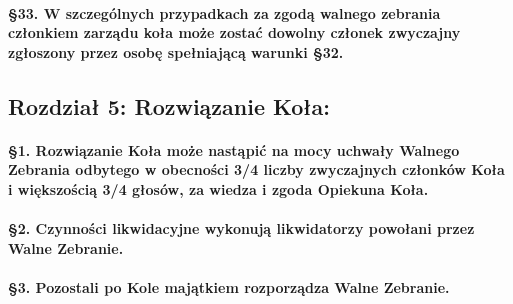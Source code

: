 \documentclass{article}
\begin{document}
		\paragraph{\S 33. W szczególnych przypadkach za zgodą walnego zebrania członkiem zarządu koła może zostać dowolny członek zwyczajny zgłoszony przez osobę spełniającą warunki \S 32.}
\vspace{0.4cm}
\begin{center}
    \section*{Rozdział 5: Rozwiązanie Koła:}
\end{center}\vspace{0.4cm}
		\paragraph{\S 1. Rozwiązanie Koła może nastąpić na mocy uchwały Walnego Zebrania odbytego w obecności 3/4 liczby zwyczajnych członków Koła
                           i większością 3/4 głosów, za wiedza i zgoda Opiekuna Koła.}
		\paragraph{\S 2. Czynności likwidacyjne wykonują likwidatorzy powołani przez Walne Zebranie.}
		\paragraph{\S 3. Pozostali po Kole majątkiem rozporządza Walne Zebranie.}
\end{document}

